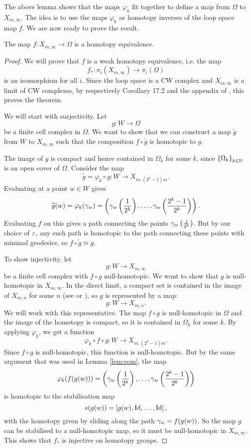 The above lemma shows that the maps $\varphi_k$ fit together to define
a map from $\Omega$ to $X_{m,\infty}$.
The idea is to use the maps $\varphi_k$ as homotopy inverses of the
loop space map $f$. We are now ready to prove the result.

\begin{theorem}
  \label{thm:loekker}
  The map $f : X_{m,\infty} \to \Omega$ is a homotopy
  equivalence.
\end{theorem}

\begin{proof}
  We will prove that $f$ is a weak homotopy equivalence, i.e. the map
  \[f_* : \pi_i(X_{m,\infty}) \to \pi_i(\Omega)\]
  is an isomorphism for all $i$. Since the
  loop space is a CW complex and $X_{m,\infty}$ is a limit of CW
  complexes, by respectively Corollary 17.2 and the appendix of
  \cite{milnor}, this proves the theorem.
  
  We will start with surjectivity. Let
  \[ g : W \to \Omega \]
  be a finite cell complex in $\Omega$. We want to show that we can
  construct a map $\widetilde g$ from $W$ to $X_{m,\infty}$ such that
  the composition $f\circ \widetilde g$ is homotopic to $g$.
  
  The image of $g$ is compact and hence contained in $\Omega_k$ for
  some $k$, since $\left\{ \Omega_k \right\}_{k\in\mathbb{N}}$ is an open cover of
  $\Omega$. Consider the map 
  \[ \widetilde g = \varphi_k\circ g : W \to X_{m,(2^k-1)m}. \]
  Evaluating at a point $w\in W$ gives
  \[ \widetilde g(w) = \varphi_k(\gamma_w) = \left(
    \gamma_w\left(\frac{1}{2^k}\right),\dots,
    \gamma_w\left(\frac{2^k-1}{2^k}\right) \right). \]
  Evaluating $f$ on this gives a path connecting the points
  $\gamma_w\left(\frac{j}{2^k}\right)$. But by our choice of $\varepsilon$, any
  such path is homotopic to the path connecting these points with
  minimal geodesics, so $f\circ\widetilde g \simeq g$.

  To show injectivity, let
  \[ g : W \to X_{m,\infty}\]
  be a finite cell complex with $f\circ g$ null-homotopic. We want to
  show that $g$ is null-homotopic in $X_{m,\infty}$. In the
  direct limit, a compact set is contained in the image of $X_{m,n}$
  for some $n$ (see \cite[Proposition~A.1]{hatcher} or
  \cite[Chapter~9.4]{may}), so $g$ is represented by a map:
  \[ g : W \to X_{m,n}. \]
  We will work with this representative. The map $f\circ
  g$ is null-homotopic in $\Omega$ and the image of the homotopy is
  compact, so it is
  contained in $\Omega_k$ for some $k$. By applying $\varphi_k$, we
  get a function
  \[ \varphi_k\circ f\circ g : W \to X_{m,(2^k-1)m}. \]
  Since $f\circ g$ is null-homotopic, this function is
  null-homotopic. But by the same argument that was used in
  Lemma \ref{lem:com}, the map
  \[ \varphi_k(f(g(w))) = \left(
    \gamma_w\left(\frac{1}{2^k}\right),\dots,\gamma_w\left(\frac{2^k-1}{2^k}
    \right)\right) \] 
  is homotopic to the stabilisation map
  \[ s(g(w)) = \left[g(w),\operatorname{Id},\dots,\operatorname{Id}\right], \]
  with the homotopy given by sliding along the path $\gamma_w=f(g(w))$.
  So the map $g$ can be stabilised to a null-homotopic map, so it must
  be null-homotopic in $X_{m,\infty}$. This shows that $f_*$ is
  injective on homotopy groups.
\end{proof}

